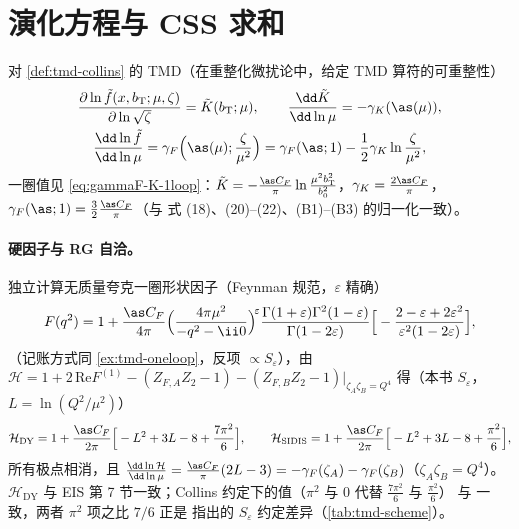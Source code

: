\section{演化方程与 CSS 求和}
\label{sec:tmd-evolution}

\begin{proposition}\tagR
\label{prop:cs-rg}
对 \cref{def:tmd-collins} 的 TMD（在重整化微扰论中，给定 TMD 算符的可重整性）
\begin{equation}
  \begin{gathered}
  \frac{\partial\ln\tilde f(x,b_{\mathrm T};\mu,\zeta)}{\partial\ln\sqrt\zeta}=\tilde K(b_{\mathrm T};\mu),\qquad
  \frac{\dd\tilde K}{\dd\ln\mu}=-\gamma_K(\as(\mu)),\\
  \frac{\dd\ln\tilde f}{\dd\ln\mu}=\gamma_F\Big(\as(\mu);\frac{\zeta}{\mu^2}\Big)=\gamma_F(\as;1)-\frac12\gamma_K\ln\frac{\zeta}{\mu^2},
  \end{gathered}
  \label{eq:cs-rg}
\end{equation}
一圈值见 \eqref{eq:gammaF-K-1loop}：$\tilde K=-\frac{\as C_F}{\pi}\ln\frac{\mu^2b_{\mathrm T}^2}{b_0^2}$，$\gamma_K=\frac{2\as C_F}{\pi}$，
$\gamma_F(\as;1)=\frac32\frac{\as C_F}{\pi}$（与 \cite{AybatRogers2011} 式 (18)、(20)--(22)、(B1)--(B3) 的归一化一致）。
\end{proposition}

\paragraph{硬因子与 RG 自洽。}独立计算无质量夸克一圈形状因子（Feynman 规范，$\varepsilon$ 精确）
\begin{equation}
  F(q^2)=1+\frac{\as C_F}{4\pi}\Big(\frac{4\pi\mu^2}{-q^2-\ii0}\Big)^{\!\varepsilon}\frac{\Gamma(1+\varepsilon)\Gamma^2(1-\varepsilon)}{\Gamma(1-2\varepsilon)}
  \Big[-\frac{2-\varepsilon+2\varepsilon^2}{\varepsilon^2(1-2\varepsilon)}\Big],
  \label{eq:quark-ff}
\end{equation}
（记账方式同 \cref{ex:tmd-oneloop}，反项 $\propto S_\varepsilon$），由 $\mathcal H=1+2\,\mathrm{Re}F^{(1)}-(Z_{F,A}Z_2-1)-(Z_{F,B}Z_2-1)|_{\zeta_A\zeta_B=Q^4}$ 得（本书 $S_\varepsilon$，$L=\ln(Q^2/\mu^2)$）
\begin{equation}
  \mathcal H_{\mathrm{DY}}=1+\frac{\as C_F}{2\pi}\Big[-L^2+3L-8+\frac{7\pi^2}{6}\Big],\qquad
  \mathcal H_{\mathrm{SIDIS}}=1+\frac{\as C_F}{2\pi}\Big[-L^2+3L-8+\frac{\pi^2}{6}\Big],
  \label{eq:hard-DY}
\end{equation}
所有极点相消，且 $\frac{\dd\ln\mathcal H}{\dd\ln\mu}=\frac{\as C_F}{\pi}(2L-3)=-\gamma_F(\zeta_A)-\gamma_F(\zeta_B)$（$\zeta_A\zeta_B=Q^4$）。
$\mathcal H_{\mathrm{DY}}$ 与 EIS\cite{EchevarriaIdilbiScimemi2012} 第 7 节一致；Collins 约定下的值（$\pi^2$ 与 $0$ 代替 $\frac{7\pi^2}6$ 与 $\frac{\pi^2}6$）
与 \cite{AybatRogers2011b} 一致，两者 $\pi^2$ 项之比 $7/6$ 正是 \cite{CollinsRogers2013} 指出的 $S_\varepsilon$ 约定差异（\cref{tab:tmd-scheme}）。

